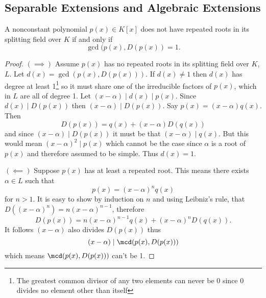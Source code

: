 \documentclass[12pt,oneside]{book}
\begin{document}
\subsection{Separable Extensions and Algebraic Extensions}
\begin{lemma}\label{lemma:repeated roots if and only if polynomial and derivative are
	relatively prime}
	A nonconstant polynomial \( p(x) \in K[x] \) does not have repeated roots in its
	splitting field over \( K \) if and only if
	\begin{equation*}
		\gcd(p(x), D(p(x)) = 1.
	\end{equation*}
\end{lemma}
\begin{proof}
	\( (\implies) \) Assume \( p(x) \) has no repeated roots in its splitting field over \(
	K\), \( L \). Let \( d(x) = \gcd(p(x), D(p(x))) \). If \( d(x) \neq 1 \) then \( d(x) \)
	has degree at least 1\footnote{The greatest common divisor of any two elements can never
	be 0 since 0 divides no element other than itself} so it must share one of the
	irreducible factors of \( p(x) \), which in \( L \) are all of degree 1. Let \(
	(x-\alpha) \mid d(x) \mid p(x) \). Since \( d(x) \mid D(p(x)) \) then \( (x -
	\alpha) \mid D(p(x)) \). Say \( p(x) = (x - \alpha)q(x) \). Then
	\begin{equation*}
		D(p(x)) = q(x) + (x - \alpha)D(q(x))
	\end{equation*}
	and since \( (x - \alpha) \mid D(p(x)) \) it must be that \( (x - \alpha) \mid q(x) \).
	But this would mean \( (x - \alpha)^2 \mid p(x) \) which cannot be the case since \(
	\alpha \) is a root of \( p(x) \) and therefore assumed to be simple. Thus \( d(x) = 1
	\).
	
	\( (\impliedby) \) Suppose \( p(x) \) has at least a repeated root. This means there
	exists \( \alpha \in L \) such that 
	\begin{equation*}
		p(x) = (x - \alpha)^nq(x)
	\end{equation*}
	for \( n > 1 \). It is easy to show by induction on \( n \) and using Leibniz's rule,
	that \( D((x - \alpha)^n) = n(x -\alpha)^{n-1} \), therefore
	\begin{equation*}
		D(p(x)) = n(x - \alpha)^{n-1}q(x) + (x - \alpha)^nD(q(x)).
	\end{equation*}
	It follows \( (x - \alpha) \) also divides \( D(p(x)) \) thus
	\begin{equation*}
		(x - \alpha) \mid \mcd(p(x), D(p(x)))
	\end{equation*}
	which means \( \mcd(p(x), D(p(x))) \) can't be 1.
\end{proof}
\end{document}
